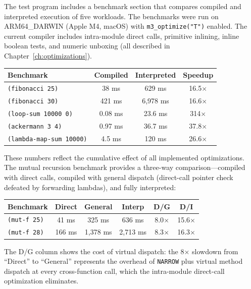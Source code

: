 \documentclass[12pt]{report}
\begin{document}
The test program includes a benchmark section that compares compiled
and interpreted execution of five workloads.  The benchmarks were
run on ARM64\_DARWIN (Apple M4, macOS) with \texttt{m3\_optimize("T")}
enabled.  The current compiler includes intra-module direct calls,
primitive inlining, inline boolean tests, and numeric unboxing
(all described in Chapter~\ref{ch:optimizations}).

\begin{center}
\begin{tabular}{lccc}
\toprule
\textbf{Benchmark} & \textbf{Compiled} & \textbf{Interpreted} & \textbf{Speedup} \\
\midrule
\texttt{(fibonacci 25)}         &  38 ms    &   629 ms  & 16.5$\times$ \\
\texttt{(fibonacci 30)}         & 421 ms    & 6,978 ms  & 16.6$\times$ \\
\texttt{(loop-sum 10000 0)}     & 0.08 ms   &  23.6 ms  & 314$\times$ \\
\texttt{(ackermann 3 4)}        & 0.97 ms   &  36.7 ms  & 37.8$\times$ \\
\texttt{(lambda-map-sum 10000)} & 4.5 ms    &   120 ms  & 26.6$\times$ \\
\bottomrule
\end{tabular}
\end{center}

\noindent
These numbers reflect the cumulative effect of all implemented
optimizations.  The mutual recursion benchmark provides a
three-way comparison---compiled with direct calls, compiled with
general dispatch (direct-call pointer check defeated by forwarding
lambdas), and fully interpreted:

\begin{center}
\begin{tabular}{lccccc}
\toprule
\textbf{Benchmark} & \textbf{Direct} & \textbf{General} & \textbf{Interp} & \textbf{D/G} & \textbf{D/I} \\
\midrule
\texttt{(mut-f 25)} &  41 ms & 325 ms &   636 ms & 8.0$\times$ & 15.6$\times$ \\
\texttt{(mut-f 28)} & 166 ms & 1,378 ms & 2,713 ms & 8.3$\times$ & 16.3$\times$ \\
\bottomrule
\end{tabular}
\end{center}

\noindent
The D/G column shows the cost of virtual dispatch: the 8$\times$
slowdown from ``Direct'' to ``General'' represents the overhead of
\texttt{NARROW} plus virtual method dispatch at every cross-function
call, which the intra-module direct-call optimization eliminates.
\end{document}
